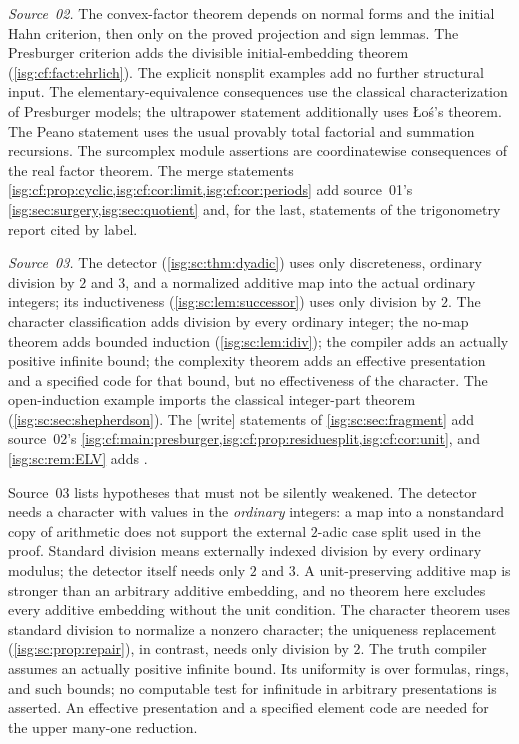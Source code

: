 \documentclass[11pt]{article}
\theoremstyle{definition}
\theoremstyle{remark}
\begin{document}
\emph{Source~02.} The convex-factor theorem depends on normal forms and
the initial Hahn criterion, then only on the proved projection and sign
lemmas. The Presburger criterion adds the divisible initial-embedding
theorem (\cref{isg:cf:fact:ehrlich}). The explicit nonsplit examples add
no further structural input. The elementary-equivalence consequences use
the classical characterization of Presburger models; the ultrapower
statement additionally uses \L o\'s's theorem. The Peano statement uses
the usual provably total factorial and summation recursions. The
surcomplex module assertions are coordinatewise consequences of the real
factor theorem. The merge statements
\cref{isg:cf:prop:cyclic,isg:cf:cor:limit,isg:cf:cor:periods} add
source~01's \cref{isg:sec:surgery,isg:sec:quotient} and, for the last,
statements of the trigonometry report cited by label.

\emph{Source~03.} The detector (\cref{isg:sc:thm:dyadic}) uses only
discreteness, ordinary division by $2$ and $3$, and a normalized additive
map into the actual ordinary integers; its inductiveness
(\cref{isg:sc:lem:successor}) uses only division by $2$. The character
classification adds division by every ordinary integer; the no-map theorem
adds bounded induction (\cref{isg:sc:lem:idiv}); the compiler adds an
actually positive infinite bound; the complexity theorem adds an effective
presentation and a specified code for that bound, but no effectiveness of
the character. The open-induction example imports the classical
integer-part theorem (\cref{isg:sc:sec:shepherdson}). The
\textup{[write]} statements of \cref{isg:sc:sec:fragment} add source~02's
\cref{isg:cf:main:presburger,isg:cf:prop:residuesplit,isg:cf:cor:unit}, and
\cref{isg:sc:rem:ELV} adds \cite[Theorem~2.9]{ELV}.

Source~03 lists hypotheses that must not be silently weakened. The
detector needs a character with values in the \emph{ordinary} integers: a
map into a nonstandard copy of arithmetic does not support the external
$2$-adic case split used in the proof. Standard division means externally
indexed division by every ordinary modulus; the detector itself needs only
$2$ and $3$. A unit-preserving additive map is stronger than an arbitrary
additive embedding, and no theorem here excludes every additive embedding
without the unit condition. The character theorem uses standard division
to normalize a nonzero character; the uniqueness replacement
(\cref{isg:sc:prop:repair}), in contrast, needs only division by $2$. The
truth compiler assumes an actually positive infinite bound. Its uniformity
is over formulas, rings, and such bounds; no computable test for
infinitude in arbitrary presentations is asserted. An effective
presentation and a specified element code are needed for the upper
many-one reduction.
\end{document}
